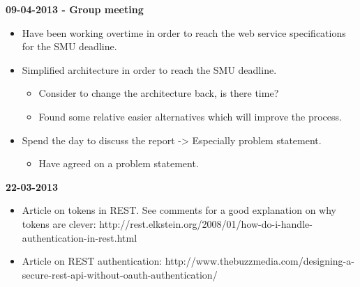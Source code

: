 \documentclass[11pt]{article}
\begin{document}
\begin{landscape}
\begin{multicols}{2}
\textbf{09-04-2013 - Group meeting}
\begin{itemize}
\item Have been working overtime in order to reach the web service specifications for the SMU deadline.
\item Simplified architecture in order to reach the SMU deadline.
\begin{itemize}
\item Consider to change the architecture back, is there time?
\item Found some relative easier alternatives which will improve the process.
\end{itemize}
\item Spend the day to discuss the report -> Especially problem statement.
\begin{itemize}
\item Have agreed on a problem statement.
\end{itemize}
\end{itemize}

\textbf{22-03-2013}
\begin{itemize}
\item Article on tokens in REST. See comments for a good explanation on why tokens are clever: http://rest.elkstein.org/2008/01/how-do-i-handle-authentication-in-rest.html 
\item Article on REST authentication: http://www.thebuzzmedia.com/designing-a-secure-rest-api-without-oauth-authentication/ 
\end{itemize}


\end{multicols}
\end{landscape}
\end{document}
